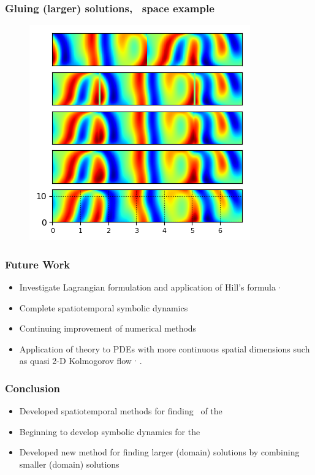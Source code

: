 \documentclass[mathserif, handout]{beamer}
\begin{document}
\begin{frame}%
  \frametitle{Gluing (larger) solutions, \ppo\ space example}
  \begin{figure}
  \includegraphics[width=.6\textwidth]{MNG_ppo1ppo2_space}
  \end{figure}
\end{frame}

\begin{frame}
\frametitle{Future Work}
\begin{itemize}

\item Investigate Lagrangian formulation and application of Hill's formula%
${}^,$%
\item Complete spatiotemporal symbolic dynamics
\item Continuing improvement of numerical methods
\item Application of theory to PDEs with more continuous spatial dimensions such as
quasi 2-D Kolmogorov flow%
${}^,$%
.

\end{itemize}
\end{frame}

\begin{frame}
\frametitle{Conclusion}
\begin{itemize}
\item Developed spatiotemporal methods for finding \twots\ of the \KSe\
\item Beginning to develop symbolic dynamics for the \spt\ \KSe\
\item Developed new method for finding larger (domain) solutions by combining
smaller (domain) solutions
\end{itemize}
\end{frame}

%  
\end{document}
